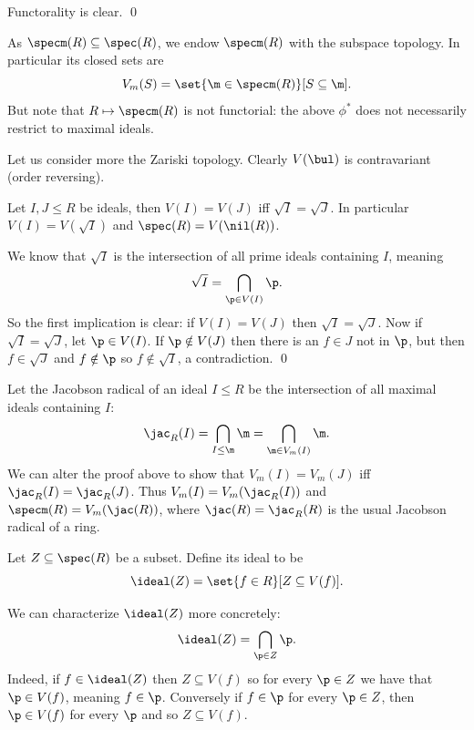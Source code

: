     Functorality is clear.
    \qed

\eproof

\bnote

    As $\specm(R)\subseteq\spec(R)$, we endow $\specm(R)$ with the subspace topology.
    In particular its closed sets are
    $$ V_m(S) = \set{\m\in\specm(R)}[S\subseteq\m] . $$
    But note that $R\mapsto\specm(R)$ is not functorial: the above $\phi^*$ does not necessarily restrict to maximal ideals.

\enote

Let us consider more the Zariski topology.
Clearly $V(\bul)$ is contravariant (order reversing).

\bprop

    Let $I,J\leq R$ be ideals, then $V(I)=V(J)$ iff $\sqrt I=\sqrt J$.
    In particular $V(I)=V(\sqrt I)$ and $\spec(R)=V(\nil(R))$.

\eprop

\bproof

    We know that $\sqrt I$ is the intersection of all prime ideals containing $I$, meaning
    $$ \sqrt I = \bigcap_{\p\in V(I)}\p . $$
    So the first implication is clear: if $V(I)=V(J)$ then $\sqrt I=\sqrt J$.
    Now if $\sqrt I=\sqrt J$, let $\p\in V(I)$.
    If $\p\notin V(J)$ then there is an $f\in J$ not in $\p$, but then $f\in\sqrt J$ and $f\notin\p$ so $f\notin\sqrt I$, a contradiction.
    \qed

\eproof

\bnote

    Let the {\emphcolor Jacobson radical} of an ideal $I\leq R$ be the intersection of all maximal ideals containing $I$:
    $$ \jac_R(I) = \bigcap_{I\leq\m}\m = \bigcap_{\m\in V_m(I)}\m . $$
    We can alter the proof above to show that $V_m(I)=V_m(J)$ iff $\jac_R(I)=\jac_R(J)$.
    Thus $V_m(I)=V_m(\jac_R(I))$ and $\specm(R)=V_m(\jac(R))$, where $\jac(R)=\jac_R(R)$ is the usual Jacobson radical of a ring.

\enote

\bdefn

    Let $Z\subseteq\spec(R)$ be a subset.
    Define its {\emphcolor ideal} to be
    $$ \ideal(Z) = \set{f\in R}[Z\subseteq V(f)] . $$

\edefn

We can characterize $\ideal(Z)$ more concretely:
$$ \ideal(Z) = \bigcap_{\p\in Z}\p . $$
Indeed, if $f\in\ideal(Z)$ then $Z\subseteq V(f)$ so for every $\p\in Z$ we have that $\p\in V(f)$, meaning $f\in\p$.
Conversely if $f\in\p$ for every $\p\in Z$, then $\p\in V(f)$ for every $\p$ and so $Z\subseteq V(f)$.

